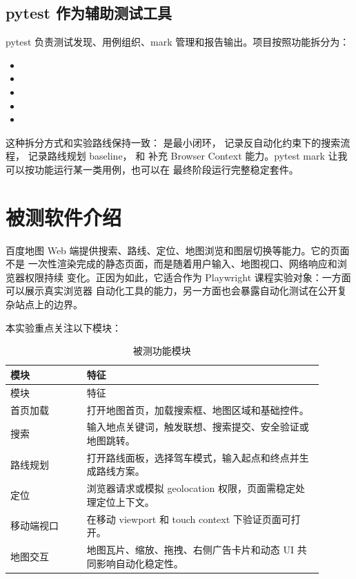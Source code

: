 \documentclass[UTF8,a4paper,12pt]{ctexart}
\begin{document}
\subsection{pytest 作为辅助测试工具}

pytest 负责测试发现、用例组织、mark 管理和报告输出。项目按照功能拆分为：

\begin{itemize}
  \item {}
  \item {}
  \item {}
  \item {}
  \item {}
\end{itemize}

这种拆分方式和实验路线保持一致： 是最小闭环，
 记录反自动化约束下的搜索流程，
记录路线规划 baseline， 和 
补充 Browser Context 能力。pytest mark 让我可以按功能运行某一类用例，也可以在
最终阶段运行完整稳定套件。

\section{被测软件介绍}

百度地图 Web 端提供搜索、路线、定位、地图浏览和图层切换等能力。它的页面不是
一次性渲染完成的静态页面，而是随着用户输入、地图视口、网络响应和浏览器权限持续
变化。正因为如此，它适合作为 Playwright 课程实验对象：一方面可以展示真实浏览器
自动化工具的能力，另一方面也会暴露自动化测试在公开复杂站点上的边界。

本实验重点关注以下模块：

\begin{longtable}{p{0.22\linewidth}p{0.68\linewidth}}
\caption{被测功能模块} \\
\toprule
模块 & 特征 \\
\midrule
\endfirsthead
\toprule
模块 & 特征 \\
\midrule
\endhead
首页加载 & 打开地图首页，加载搜索框、地图区域和基础控件。 \\
搜索 & 输入地点关键词，触发联想、搜索提交、安全验证或地图跳转。 \\
路线规划 & 打开路线面板，选择驾车模式，输入起点和终点并生成路线方案。 \\
定位 & 浏览器请求或模拟 geolocation 权限，页面需稳定处理定位上下文。 \\
移动端视口 & 在移动 viewport 和 touch context 下验证页面可打开。 \\
地图交互 & 地图瓦片、缩放、拖拽、右侧广告卡片和动态 UI 共同影响自动化稳定性。 \\
\bottomrule
\end{longtable}
\end{document}
